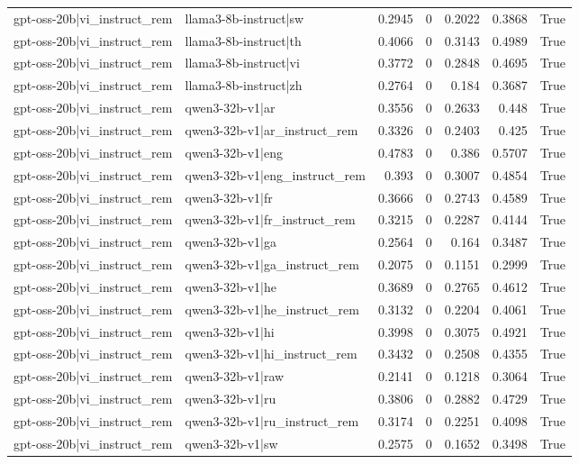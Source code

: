 \begin{table}
\begin{tabular}{l l r r r r l}
gpt-oss-20b|vi_instruct_rem & llama3-8b-instruct|sw & 0.2945 & 0 & 0.2022 & 0.3868 & True \\
gpt-oss-20b|vi_instruct_rem & llama3-8b-instruct|th & 0.4066 & 0 & 0.3143 & 0.4989 & True \\
gpt-oss-20b|vi_instruct_rem & llama3-8b-instruct|vi & 0.3772 & 0 & 0.2848 & 0.4695 & True \\
gpt-oss-20b|vi_instruct_rem & llama3-8b-instruct|zh & 0.2764 & 0 & 0.184 & 0.3687 & True \\
gpt-oss-20b|vi_instruct_rem & qwen3-32b-v1|ar & 0.3556 & 0 & 0.2633 & 0.448 & True \\
gpt-oss-20b|vi_instruct_rem & qwen3-32b-v1|ar_instruct_rem & 0.3326 & 0 & 0.2403 & 0.425 & True \\
gpt-oss-20b|vi_instruct_rem & qwen3-32b-v1|eng & 0.4783 & 0 & 0.386 & 0.5707 & True \\
gpt-oss-20b|vi_instruct_rem & qwen3-32b-v1|eng_instruct_rem & 0.393 & 0 & 0.3007 & 0.4854 & True \\
gpt-oss-20b|vi_instruct_rem & qwen3-32b-v1|fr & 0.3666 & 0 & 0.2743 & 0.4589 & True \\
gpt-oss-20b|vi_instruct_rem & qwen3-32b-v1|fr_instruct_rem & 0.3215 & 0 & 0.2287 & 0.4144 & True \\
gpt-oss-20b|vi_instruct_rem & qwen3-32b-v1|ga & 0.2564 & 0 & 0.164 & 0.3487 & True \\
gpt-oss-20b|vi_instruct_rem & qwen3-32b-v1|ga_instruct_rem & 0.2075 & 0 & 0.1151 & 0.2999 & True \\
gpt-oss-20b|vi_instruct_rem & qwen3-32b-v1|he & 0.3689 & 0 & 0.2765 & 0.4612 & True \\
gpt-oss-20b|vi_instruct_rem & qwen3-32b-v1|he_instruct_rem & 0.3132 & 0 & 0.2204 & 0.4061 & True \\
gpt-oss-20b|vi_instruct_rem & qwen3-32b-v1|hi & 0.3998 & 0 & 0.3075 & 0.4921 & True \\
gpt-oss-20b|vi_instruct_rem & qwen3-32b-v1|hi_instruct_rem & 0.3432 & 0 & 0.2508 & 0.4355 & True \\
gpt-oss-20b|vi_instruct_rem & qwen3-32b-v1|raw & 0.2141 & 0 & 0.1218 & 0.3064 & True \\
gpt-oss-20b|vi_instruct_rem & qwen3-32b-v1|ru & 0.3806 & 0 & 0.2882 & 0.4729 & True \\
gpt-oss-20b|vi_instruct_rem & qwen3-32b-v1|ru_instruct_rem & 0.3174 & 0 & 0.2251 & 0.4098 & True \\
gpt-oss-20b|vi_instruct_rem & qwen3-32b-v1|sw & 0.2575 & 0 & 0.1652 & 0.3498 & True \\

\end{tabular}
\end{table}
